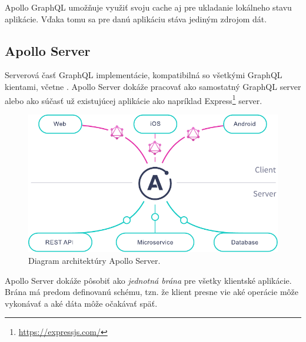 \bigskip

\noindent Apollo GraphQL umožňuje využiť svoju cache aj pre ukladanie lokálneho stavu aplikácie. Vďaka tomu sa pre danú aplikáciu stáva jediným zdrojom dát.

\subsection{Apollo Server}
Serverová časť GraphQL implementácie, kompatibilná so všetkými GraphQL kientami, včetne . Apollo Server dokáže pracovať ako samostatný GraphQL server alebo ako súčasť už existujúcej aplikácie ako napríklad Express\footnote{\href{https://expressjs.com/}{https://expressjs.com/}} server. \cite{Apollo} \\

\begin{figure}[h]
	\centering
	\includegraphics[scale=0.8]{obrazky-figures/apollo_server_diagram}
	\caption{Diagram architektúry Apollo Server. \cite{Apollo}}
\end{figure}

\noindent Apollo Server dokáže pôsobiť ako \emph{jednotná brána} pre všetky klientské aplikácie. Brána má predom definovanú schému, tzn. že klient presne vie aké operácie môže vykonávať a aké dáta môže očakávať späť.



